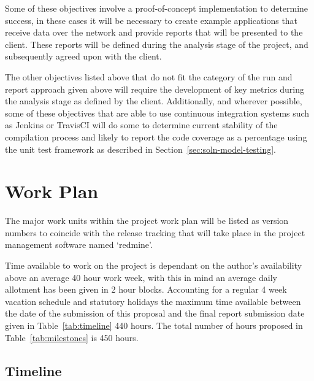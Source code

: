 \documentclass[11pt]{article}
\begin{document}
    Some of these objectives involve a proof-of-concept implementation to
    determine success, in these cases it will be necessary to create example
    applications that receive data over the network and provide reports that
    will be presented to the client. These reports will be defined during the
    analysis stage of the project, and subsequently agreed upon with the
    client.

    The other objectives listed above that do not fit the category of the run
    and report approach given above will require the development of key metrics
    during the analysis stage as defined by the client. Additionally, and
    wherever possible, some of these objectives that are able to use continuous
    integration systems such as Jenkins or TravisCI will do some to determine
    current stability of the compilation process and likely to report the code
    coverage as a percentage using the unit test framework as described in
    Section~\ref{sec:soln-model-testing}.

  \newpage

  \section{Work Plan}\label{sec:plan}

    The major work units within the project work plan will be listed as version
    numbers to coincide with the release tracking that will take place in the
    project management software named `redmine'.

    Time available to work on the project is dependant on the author's
    availability above an average 40 hour work week, with this in mind an
    average daily allotment has been given in 2 hour blocks. Accounting for
    a regular 4 week vacation schedule and statutory holidays the maximum time
    available between the date of the submission of this proposal and the
    final report submission date given in Table~\ref{tab:timeline} 440 hours.
    The total number of hours proposed in Table~\ref{tab:milestones} is 450
    hours.

    \subsection{Timeline}\label{sec:plan-time}
\end{document}
